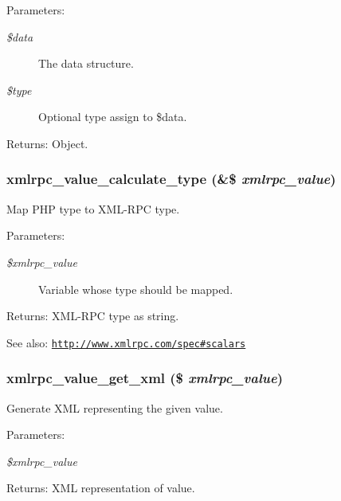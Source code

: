 \begin{Desc}
\item[Parameters:]
\begin{description}
\item[{\em \$data}]The data structure. \item[{\em \$type}]Optional type assign to \$data. \end{description}
\end{Desc}
\begin{Desc}
\item[Returns:]Object. \end{Desc}
\hypertarget{xmlrpc_8inc_3747d5c350b8db7126ccae2f6ae3e6ed}{
\subsubsection[{xmlrpc\_\-value\_\-calculate\_\-type}]{\setlength{\rightskip}{0pt plus 5cm}xmlrpc\_\-value\_\-calculate\_\-type (\&\$ {\em xmlrpc\_\-value})}}
\label{xmlrpc_8inc_3747d5c350b8db7126ccae2f6ae3e6ed}


Map PHP type to XML-RPC type.

\begin{Desc}
\item[Parameters:]
\begin{description}
\item[{\em \$xmlrpc\_\-value}]Variable whose type should be mapped. \end{description}
\end{Desc}
\begin{Desc}
\item[Returns:]XML-RPC type as string. \end{Desc}
\begin{Desc}
\item[See also:]\href{http://www.xmlrpc.com/spec#scalars}{\tt http://www.xmlrpc.com/spec\#scalars} \end{Desc}
\hypertarget{xmlrpc_8inc_d06538892136f5c1edb0580b2432e189}{
\subsubsection[{xmlrpc\_\-value\_\-get\_\-xml}]{\setlength{\rightskip}{0pt plus 5cm}xmlrpc\_\-value\_\-get\_\-xml (\$ {\em xmlrpc\_\-value})}}
\label{xmlrpc_8inc_d06538892136f5c1edb0580b2432e189}


Generate XML representing the given value.

\begin{Desc}
\item[Parameters:]
\begin{description}
\item[{\em \$xmlrpc\_\-value}]\end{description}
\end{Desc}
\begin{Desc}
\item[Returns:]XML representation of value. \end{Desc}
